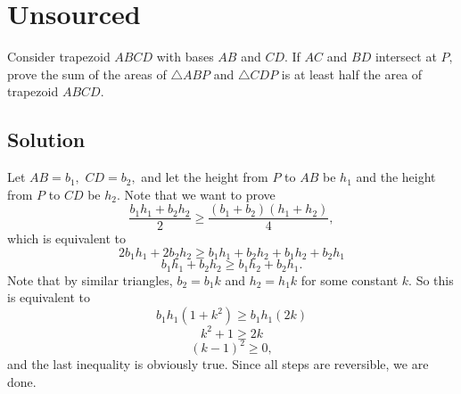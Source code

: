 \documentclass[mast]{lucky}
\begin{document}
\pagebreak\section{Unsourced}
Consider trapezoid $ABCD$ with bases $AB$ and $CD.$ If $AC$ and $BD$ intersect at $P,$ prove the sum of the areas of $\triangle ABP$ and $\triangle CDP$ is at least half the area of trapezoid $ABCD.$

\subsection{Solution}

Let $AB=b_1,$ $CD=b_2,$ and let the height from $P$ to $AB$ be $h_1$ and the height from $P$ to $CD$ be $h_2.$ Note that we want to prove
\[\frac{b_1h_1+b_2h_2}{2}\geq \frac{(b_1+b_2)(h_1+h_2)}{4},\]
which is equivalent to
\[2b_1h_1+2b_2h_2\geq b_1h_1+b_2h_2+b_1h_2+b_2h_1\]
\[b_1h_1+b_2h_2\geq b_1h_2+b_2h_1.\]
Note that by similar triangles, $b_2=b_1k$ and $h_2=h_1k$ for some constant $k.$ So this is equivalent to
\[b_1h_1(1+k^2)\geq b_1h_1(2k)\]
\[k^2+1\geq 2k\]
\[(k-1)^2\geq 0,\]
and the last inequality is obviously true. Since all steps are reversible, we are done.

\begin{center}
\end{center}
\end{document}
